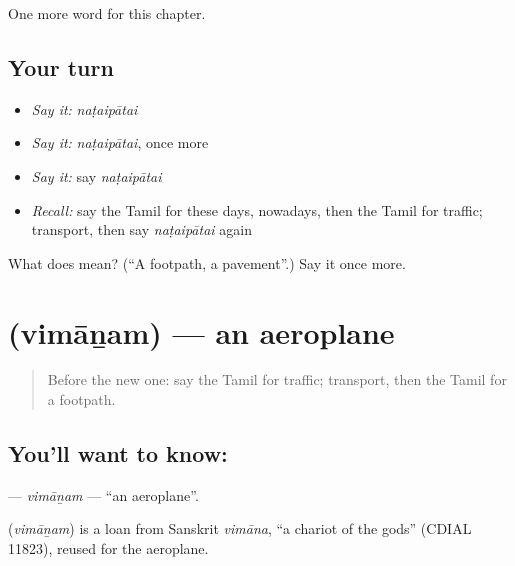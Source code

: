 \begin{grammarlens}[title={What you've built}]
One more word for this chapter.
\end{grammarlens}

\subsection*{Your turn}
\begin{itemize}
\raggedright
  \item \emph{Say it:} \emph{naṭaipātai}
  \item \emph{Say it:} \emph{naṭaipātai}, once more
  \item \emph{Say it:} say \emph{naṭaipātai}
  \item \emph{Recall:} say the Tamil for these days, nowadays, then the Tamil for traffic; transport, then say \emph{naṭaipātai} again
\end{itemize}

\begin{tcolorbox}[breakable,colback=teal!4,colframe=teal!35!black,title={Before you move on}]
What does  mean? (\textquotedblleft{}A footpath, a pavement\textquotedblright{}.) Say it once more.
\end{tcolorbox}
\section[\texorpdfstring{\ta{விமானம்} (vimāṉam)}{விமானம் (vimāṉam)}]{ (vimāṉam) — an aeroplane}

\label{lesson:TA-C263-vimanam}



\begin{quote}
Before the new one: say the Tamil for traffic; transport, then the Tamil for a footpath.
\end{quote}

\subsection*{You'll want to know: }
\textbf{} — \emph{vimāṉam} — \textquotedblleft{}an aeroplane\textquotedblright{}.

\begin{cousinweb}
\textbf{} (\emph{vimāṉam}) is a loan from Sanskrit \emph{vimāna}, \textquotedblleft{}a chariot of the gods\textquotedblright{} (CDIAL 11823), reused for the aeroplane.
\end{cousinweb}

